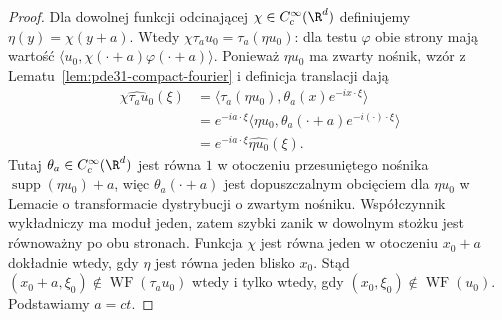 \begin{proof}
Dla dowolnej funkcji odcinającej
$\chi\in C_c^\infty(\R^d)$ definiujemy
$\eta(y)=\chi(y+a)$. Wtedy
$\chi\tau_a u_0=\tau_a(\eta u_0)$: dla testu
$\varphi$ obie strony mają wartość
$\langle u_0,\chi(\cdot+a)\varphi(\cdot+a)\rangle$.
Ponieważ $\eta u_0$ ma zwarty nośnik, wzór
z Lematu~\ref{lem:pde31-compact-fourier} i definicja
translacji dają
\[
 \begin{aligned}
 \widehat{\chi\tau_a u_0}(\xi)
 &=\langle \tau_a(\eta u_0),\theta_a(x)e^{-ix\cdot\xi}\rangle\\
 &=e^{-ia\cdot\xi}
 \langle\eta u_0,\theta_a(\cdot+a)e^{-i(\cdot)\cdot\xi}\rangle\\
 &=e^{-ia\cdot\xi}\widehat{\eta u_0}(\xi).
 \end{aligned}
\]
Tutaj $\theta_a\in C_c^\infty(\R^d)$ jest równa
$1$ w otoczeniu przesuniętego nośnika
$\operatorname{supp}(\eta u_0)+a$, więc
$\theta_a(\cdot+a)$ jest dopuszczalnym obcięciem
dla $\eta u_0$ w Lemacie o transformacie
dystrybucji o zwartym nośniku.
Współczynnik wykładniczy ma moduł jeden, zatem
szybki zanik w dowolnym stożku jest równoważny
po obu stronach. Funkcja $\chi$ jest równa jeden
w otoczeniu $x_0+a$ dokładnie wtedy, gdy $\eta$
jest równa jeden blisko $x_0$.
Stąd $(x_0+a,\xi_0)\notin\operatorname{WF}(\tau_a u_0)$
wtedy i tylko wtedy, gdy
$(x_0,\xi_0)\notin\operatorname{WF}(u_0)$.
Podstawiamy $a=ct$.
\end{proof}


